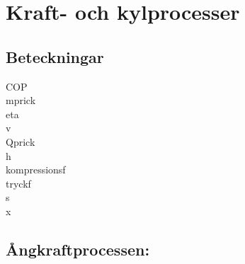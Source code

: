 \chapter{Kraft- och kylprocesser}
\section*{Beteckningar}
\acrfull{COP}\\
\acrfull{mprick}\\
\acrfull{eta}\\
\acrfull{v}\\
\acrfull{Qprick}\\
\acrfull{h}\\
\acrfull{kompressionsf}\\
\acrfull{tryckf}\\
\acrfull{s}\\
\acrfull{x} \par
\section*{Ångkraftprocessen:}

